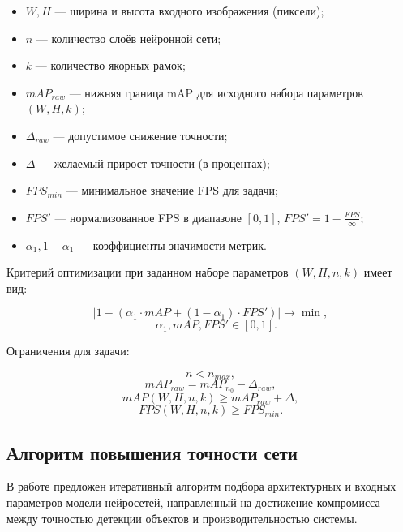 \documentclass[a4paper,12pt]{article}
\begin{document}
\begin{itemize}
    \item $W, H$ — ширина и высота входного изображения (пиксели);
    \item $n$ — количество слоёв нейронной сети;
    \item $k$ — количество якорных рамок;
    \item $mAP_{raw}$ — нижняя граница mAP для исходного набора параметров $(W,H,k)$;
    \item $\Delta_{raw}$ — допустимое снижение точности;
    \item $\Delta$ — желаемый прирост точности (в процентах);
    \item $FPS_{min}$ — минимальное значение FPS для задачи;
    \item $FPS'$ — нормализованное FPS в диапазоне $[0,1]$, $FPS' = 1 - \frac{FPS}{\infty}$;
    \item $\alpha_1, 1-\alpha_1$ — коэффициенты значимости метрик.
\end{itemize}

Критерий оптимизации при заданном наборе параметров $(W,H,n,k)$ имеет вид:

\begin{equation} \label{opt_crit}
| 1 - (\alpha_1 \cdot mAP + (1 - \alpha_1) \cdot FPS') | \to \min,
\end{equation}
\[
\quad \alpha_1, mAP, FPS' \in [0,1].
\]

Ограничения для задачи:

\begin{equation} \label{n_rest}
n < n_{max},
\end{equation}
\begin{equation} \label{map_raw_rest}
mAP_{raw} = mAP_{n_0} - \Delta_{raw},
\end{equation}
\begin{equation} \label{map_rest}
mAP(W,H,n,k) \ge mAP_{raw} + \Delta,
\end{equation}
\begin{equation} \label{fps_rest}
FPS(W,H,n,k) \ge FPS_{min}.
\end{equation}

\subsection{Алгоритм повышения точности сети}

В работе \cite{taema} предложен итеративный алгоритм подбора архитектурных и входных параметров модели нейросетей, направленный на достижение компромисса между точностью детекции объектов и производительностью системы.
\end{document}

